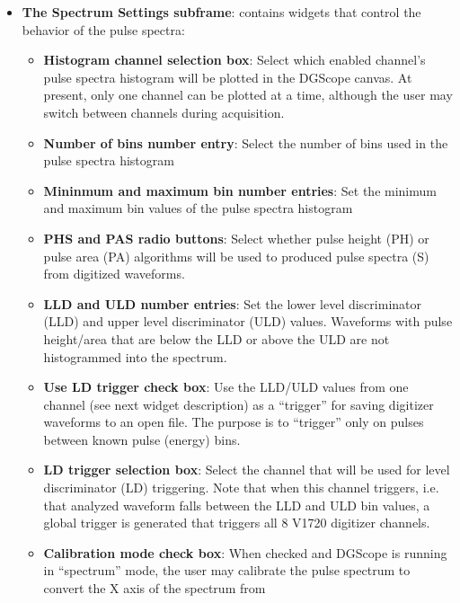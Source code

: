 \begin{itemize}
{\begin{itemize}
{        generates a software trigger. When the triggering mode is set
        to ``software'', a global trigger is generated on the V1720
        digitizer.}
    \end{itemize}
  }
\item{\textbf{The Spectrum Settings subframe}: contains widgets that
    control the behavior of the pulse spectra:
    \begin{itemize}
    \item{\textbf{Histogram channel selection box}: Select which
        enabled channel's pulse spectra histogram will be plotted in
        the DGScope canvas. At present, only one channel can be
        plotted at a time, although the user may switch between
        channels during acquisition.}
    \item{\textbf{Number of bins number entry}: Select the number of
        bins used in the pulse spectra histogram}
    \item{\textbf{Mininmum and maximum bin number entries}: Set the
        minimum and maximum bin values of the pulse spectra histogram}
    \item{\textbf{PHS and PAS radio buttons}: Select whether pulse
        height (PH) or pulse area (PA) algorithms will be used to
        produced pulse spectra (S) from digitized waveforms.}
    \item{\textbf{LLD and ULD number entries}: Set the lower level
        discriminator (LLD) and upper level discriminator (ULD)
        values. Waveforms with pulse height/area that are below the
        LLD or above the ULD are not histogrammed into the spectrum.}
    \item{\textbf{Use LD trigger check box}: Use the LLD/ULD values
        from one channel (see next widget description) as a
        ``trigger'' for saving digitizer waveforms to an open \ROOT
        file. The purpose is to ``trigger'' only on pulses between
        known pulse (energy) bins.}
    \item{\textbf{LD trigger selection box}: Select the channel that will be used
        for level discriminator (LD) triggering. Note that when this
        channel triggers, i.e. that analyzed waveform falls between
        the LLD and ULD bin values, a global trigger is generated that
        triggers all 8 V1720 digitizer channels.}
    \item{\textbf{Calibration mode check box}: When checked and
      DGScope is running in ``spectrum'' mode, the user may calibrate
      the pulse spectrum to convert the X axis of the spectrum from
}
\end{itemize}}
\end{itemize}
